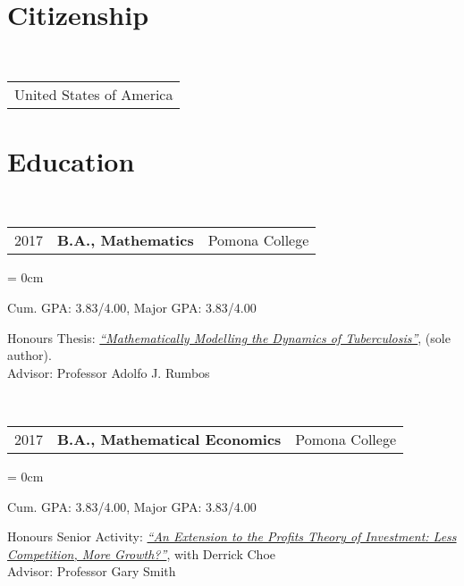 \documentclass[a4paper, 11pt]{article}
\begin{document}
    \maketitle

    \section{Citizenship}
      ~\begin{tabular}{l}
        United States of America\\
      \end{tabular}

    \section{Education}
      ~\begin{tabular}{lll}
        2017 & \textbf{B.A., Mathematics} & Pomona College\\
      \end{tabular}

    \begin{compactitem}\parskip = 0cm
      \item Cum. GPA: 3.83/4.00, Major GPA: 3.83/4.00\\
      \item Honours Thesis: \textit{\href{https://drive.google.com/file/d/0B1o_SCwTPL6TaEZuZ0ZBdXhlRms/view?usp=sharing}{``Mathematically Modelling the Dynamics of Tuberculosis''}}, (sole author).\\
      Advisor: Professor Adolfo J. Rumbos
    \end{compactitem}

    \vspace*{1em}

    ~\begin{tabular}{lll}
      2017 & \textbf{B.A., Mathematical Economics} & Pomona College\\
    \end{tabular}

    \begin{compactitem}\parskip = 0cm
      \item Cum. GPA: 3.83/4.00, Major GPA: 3.83/4.00\\
      \item Honours Senior Activity: \textit{\href{https://drive.google.com/file/d/0B1o_SCwTPL6TRzI3clFtbGdiVk0/view?usp=sharing}{``An Extension to the Profits Theory of Investment: Less Competition, More Growth?''}}, with Derrick Choe\\
      Advisor: Professor Gary Smith
    \end{compactitem}
\end{document}

